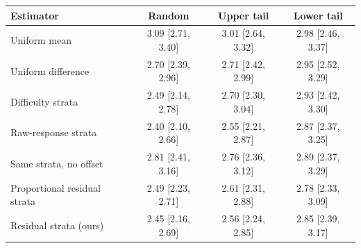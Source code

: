 \begin{tabular}{lccc}
\toprule
Estimator & Random & Upper tail & Lower tail \\
\midrule
Uniform mean & 3.09 [2.71, 3.40] & 3.01 [2.64, 3.32] & 2.98 [2.46, 3.37] \\
Uniform difference & 2.70 [2.39, 2.96] & 2.71 [2.42, 2.99] & 2.95 [2.52, 3.29] \\
Difficulty strata & 2.49 [2.14, 2.78] & 2.70 [2.30, 3.04] & 2.93 [2.42, 3.30] \\
Raw-response strata & 2.40 [2.10, 2.66] & 2.55 [2.21, 2.87] & 2.87 [2.37, 3.25] \\
Same strata, no offset & 2.81 [2.41, 3.16] & 2.76 [2.36, 3.12] & 2.89 [2.37, 3.29] \\
Proportional residual strata & 2.49 [2.23, 2.71] & 2.61 [2.31, 2.88] & 2.78 [2.33, 3.09] \\
Residual strata (ours) & 2.45 [2.16, 2.69] & 2.56 [2.24, 2.85] & 2.85 [2.39, 3.17] \\
\bottomrule
\end{tabular}
